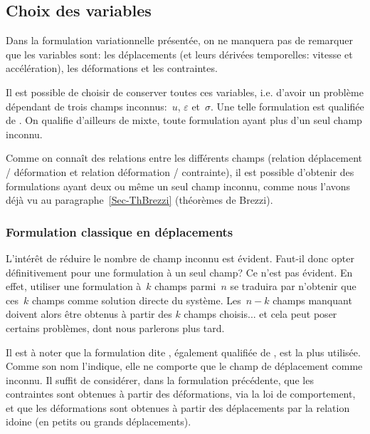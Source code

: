 \medskip
\subsection{Choix des variables}\label{Sec-form}

Dans la formulation variationnelle présentée, on ne manquera pas de remarquer que les variables sont: les déplacements (et leurs dérivées temporelles: vitesse et accélération), les déformations et les contraintes.

Il est possible de choisir de conserver toutes ces variables, i.e. d'avoir un problème dépendant de trois champs inconnus:~$u$, $\varepsilon$ et~$\sigma$. Une telle formulation est qualifiée de . On qualifie d'ailleurs de mixte, toute formulation ayant plus d'un seul champ inconnu.

Comme on connaît des relations entre les différents champs (relation déplacement / déformation et relation déformation / contrainte), il est possible d'obtenir des formulations ayant deux ou même un seul champ inconnu, comme nous l'avons déjà vu au paragraphe~\ref{Sec-ThBrezzi} (théorèmes de Brezzi).

\medskip
\subsubsection{Formulation classique en déplacements}
L'intérêt de réduire le nombre de champ inconnu est évident. Faut-il donc opter définitivement pour une formulation à un seul champ?
Ce n'est pas évident. En effet, utiliser une formulation à~$k$ champs parmi~$n$ se traduira par n'obtenir que ces~$k$ champs comme solution directe du système. Les~$n-k$ champs manquant doivent alors être obtenus à partir des $k$ champs choisis... et cela peut poser certains problèmes, dont nous parlerons plus tard.

Il est à noter que la formulation dite , également qualifiée de , est la plus utilisée. Comme son nom l'indique, elle ne comporte que le champ de déplacement comme inconnu. Il suffit de considérer, dans la formulation précédente, que les contraintes sont obtenues à partir des déformations, via la loi de comportement, et que les déformations sont obtenues à partir des déplacements par la relation idoine (en petits ou grands déplacements).

